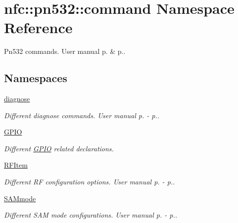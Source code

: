 \hypertarget{namespacenfc_1_1pn532_1_1command}{}\section{nfc\+:\+:pn532\+:\+:command Namespace Reference}
\label{namespacenfc_1_1pn532_1_1command}


Pn532 commands. User manual p. \& p..  


\subsection*{Namespaces}
\begin{DoxyCompactItemize}
\item 
 \hyperlink{namespacenfc_1_1pn532_1_1command_1_1diagnose}{diagnose}
\begin{DoxyCompactList}\small\item\em Different diagnose commands. User manual p. -\/ p.. \end{DoxyCompactList}\item 
 \hyperlink{namespacenfc_1_1pn532_1_1command_1_1GPIO}{G\+P\+IO}
\begin{DoxyCompactList}\small\item\em Different \hyperlink{namespacenfc_1_1pn532_1_1command_1_1GPIO}{G\+P\+IO} related declarations. \end{DoxyCompactList}\item 
 \hyperlink{namespacenfc_1_1pn532_1_1command_1_1RFItem}{R\+F\+Item}
\begin{DoxyCompactList}\small\item\em Different RF configuration options. User manual p. -\/ p.. \end{DoxyCompactList}\item 
 \hyperlink{namespacenfc_1_1pn532_1_1command_1_1SAMmode}{S\+A\+Mmode}
\begin{DoxyCompactList}\small\item\em Different S\+AM mode configurations. User manual p. -\/ p.. \end{DoxyCompactList}\end{DoxyCompactItemize}
